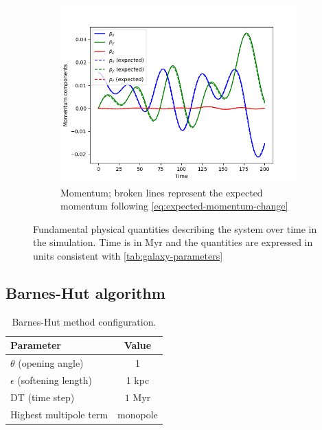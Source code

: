 \begin{figure}[H]
    \vspace{0.2cm}

    \begin{subfigure}[b]{0.5\textwidth}
        \centering
        \includegraphics[width=\textwidth]{chapters/results/img/p3m-galaxy/momentum.png}
        \caption{Momentum; broken lines represent the expected momentum following \autoref{eq:expected-momentum-change}}
        \label{fig:physical-quantities-p3m-sub3}
    \end{subfigure}

    \caption{Fundamental physical quantities describing the system over time in the \PThreeM{} simulation.
        Time is in Myr and the quantities are expressed in units consistent with \autoref{tab:galaxy-parameters}}
    \label{fig:physical-quantities-p3m}
\end{figure}

\subsection{Barnes-Hut algorithm}
\begin{table}[H]
    \centering
    \caption{Barnes-Hut method configuration.}
    \label{tab:bh-method-parameters}
    \begin{tabular}{lc}
        \toprule
        \textbf{Parameter}            & \textbf{Value} \\
        \midrule
        $\theta$ (opening angle)      & 1              \\
        $\epsilon$ (softening length) & 1 kpc          \\
        DT (time step)                & $1$ Myr        \\
        Highest multipole term        & monopole       \\
        \bottomrule
    \end{tabular}
\end{table}

